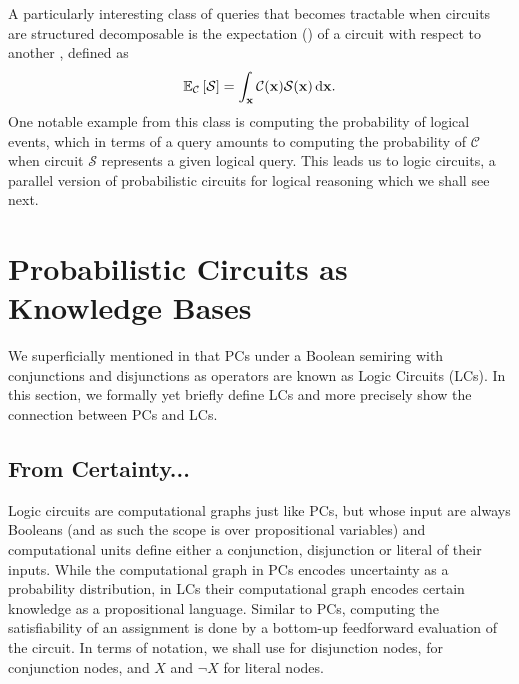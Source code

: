 A particularly interesting class of queries that becomes tractable when circuits are structured
decomposable is the expectation (\expc{}) of a circuit with respect to another \citep{choi20},
defined as
\begin{equation}
  \mathbb{E}_\mathcal{C}\left[\mathcal{S}\right]=\int_{\mathbf{x}}\mathcal{C}(\mathbf{x})\mathcal{S}(\mathbf{x})\mathop{}\!\mathrm{d}\mathbf{x}.
  \label{eq:exp}
\end{equation}
One notable example from this class is computing the probability of logical events, which in terms
of a \expc{} query amounts to computing the probability of $\mathcal{C}$ when circuit $\mathcal{S}$
represents a given logical query. This leads us to logic circuits, a parallel version of
probabilistic circuits for logical reasoning which we shall see next.

\section{Probabilistic Circuits as Knowledge Bases}
\label{sec:pckb}

We superficially mentioned in  that PCs under a Boolean semiring with
conjunctions and disjunctions as operators are known as Logic Circuits (LCs). In this section, we
formally yet briefly define LCs and more precisely show the connection between PCs and LCs.

\subsection{From Certainty...}
\label{sec:fromcertainty}

Logic circuits are computational graphs just like PCs, but whose input are always Booleans (and as
such the scope is over propositional variables) and computational units define either a
conjunction, disjunction or literal of their inputs. While the computational graph in PCs encodes
uncertainty as a probability distribution, in LCs their computational graph encodes certain
knowledge as a propositional language. Similar to PCs, computing the satisfiability of an
assignment is done by a bottom-up feedforward evaluation of the circuit. In terms of notation, we
shall use \inode{\newOrNode} for disjunction nodes, \inode{\newAndNode} for conjunction nodes, and
$X$ and $\neg X$ for literal nodes.

